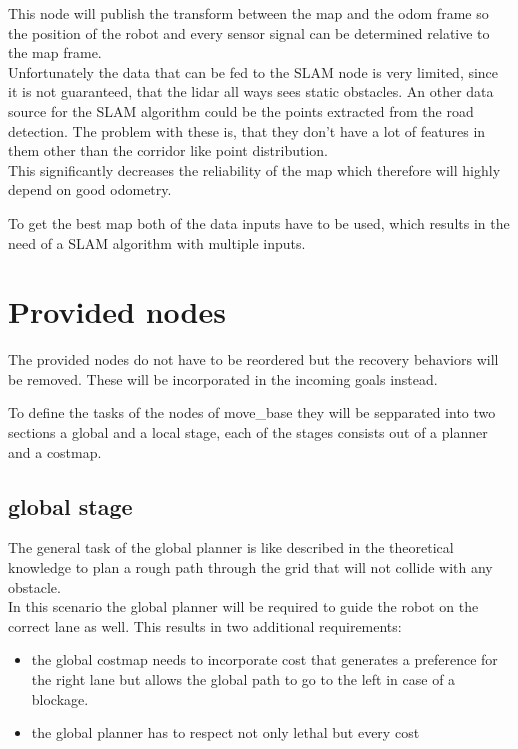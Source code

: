 This node will publish the transform between the map and the odom frame so the position of the robot and every sensor signal can be determined relative to the map frame.\\

Unfortunately the data that can be fed to the SLAM node is very limited, since it is not guaranteed, that the lidar all ways sees static obstacles. An other data source for the SLAM algorithm could be the points extracted from the road detection. The problem with these is, that they don't have a lot of features in them other than the corridor like point distribution.\\

This significantly decreases the reliability of the map which therefore will highly depend on good odometry.

To get the best map both of the data inputs have to be used, which results in the need of a SLAM algorithm with multiple inputs.\\

\section{Provided nodes}

The provided nodes do not have to be reordered but the recovery behaviors will be removed. These will be incorporated in the incoming goals instead.

To define the tasks of the nodes of move\_base they will be sepparated into two sections a global and a local stage, each of the stages consists out of a planner and a costmap.\\
\subsection{global stage}
The general task of the global planner is like described in the theoretical knowledge to plan a rough path through the grid that will not collide with any obstacle.\\

In this scenario the global planner will be required to guide the robot on the correct lane as well. This results in two additional requirements:

\begin{itemize}
	\item the global costmap needs to incorporate cost that generates a preference for the right lane but allows the global path to go to the left in case of a blockage.
	\item the global planner has to respect not only lethal but every cost
\end{itemize}

